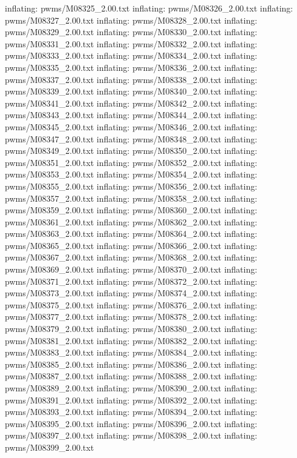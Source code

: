 \documentclass[letterpaper,10pt,english]{sphinxmanual}
\begin{document}
{\begin{sphinxVerbatim}[commandchars=\\\{\}]
  inflating: pwms/M08325\_2.00.txt
  inflating: pwms/M08326\_2.00.txt
  inflating: pwms/M08327\_2.00.txt
  inflating: pwms/M08328\_2.00.txt
  inflating: pwms/M08329\_2.00.txt
  inflating: pwms/M08330\_2.00.txt
  inflating: pwms/M08331\_2.00.txt
  inflating: pwms/M08332\_2.00.txt
  inflating: pwms/M08333\_2.00.txt
  inflating: pwms/M08334\_2.00.txt
  inflating: pwms/M08335\_2.00.txt
  inflating: pwms/M08336\_2.00.txt
  inflating: pwms/M08337\_2.00.txt
  inflating: pwms/M08338\_2.00.txt
  inflating: pwms/M08339\_2.00.txt
  inflating: pwms/M08340\_2.00.txt
  inflating: pwms/M08341\_2.00.txt
  inflating: pwms/M08342\_2.00.txt
  inflating: pwms/M08343\_2.00.txt
  inflating: pwms/M08344\_2.00.txt
  inflating: pwms/M08345\_2.00.txt
  inflating: pwms/M08346\_2.00.txt
  inflating: pwms/M08347\_2.00.txt
  inflating: pwms/M08348\_2.00.txt
  inflating: pwms/M08349\_2.00.txt
  inflating: pwms/M08350\_2.00.txt
  inflating: pwms/M08351\_2.00.txt
  inflating: pwms/M08352\_2.00.txt
  inflating: pwms/M08353\_2.00.txt
  inflating: pwms/M08354\_2.00.txt
  inflating: pwms/M08355\_2.00.txt
  inflating: pwms/M08356\_2.00.txt
  inflating: pwms/M08357\_2.00.txt
  inflating: pwms/M08358\_2.00.txt
  inflating: pwms/M08359\_2.00.txt
  inflating: pwms/M08360\_2.00.txt
  inflating: pwms/M08361\_2.00.txt
  inflating: pwms/M08362\_2.00.txt
  inflating: pwms/M08363\_2.00.txt
  inflating: pwms/M08364\_2.00.txt
  inflating: pwms/M08365\_2.00.txt
  inflating: pwms/M08366\_2.00.txt
  inflating: pwms/M08367\_2.00.txt
  inflating: pwms/M08368\_2.00.txt
  inflating: pwms/M08369\_2.00.txt
  inflating: pwms/M08370\_2.00.txt
  inflating: pwms/M08371\_2.00.txt
  inflating: pwms/M08372\_2.00.txt
  inflating: pwms/M08373\_2.00.txt
  inflating: pwms/M08374\_2.00.txt
  inflating: pwms/M08375\_2.00.txt
  inflating: pwms/M08376\_2.00.txt
  inflating: pwms/M08377\_2.00.txt
  inflating: pwms/M08378\_2.00.txt
  inflating: pwms/M08379\_2.00.txt
  inflating: pwms/M08380\_2.00.txt
  inflating: pwms/M08381\_2.00.txt
  inflating: pwms/M08382\_2.00.txt
  inflating: pwms/M08383\_2.00.txt
  inflating: pwms/M08384\_2.00.txt
  inflating: pwms/M08385\_2.00.txt
  inflating: pwms/M08386\_2.00.txt
  inflating: pwms/M08387\_2.00.txt
  inflating: pwms/M08388\_2.00.txt
  inflating: pwms/M08389\_2.00.txt
  inflating: pwms/M08390\_2.00.txt
  inflating: pwms/M08391\_2.00.txt
  inflating: pwms/M08392\_2.00.txt
  inflating: pwms/M08393\_2.00.txt
  inflating: pwms/M08394\_2.00.txt
  inflating: pwms/M08395\_2.00.txt
  inflating: pwms/M08396\_2.00.txt
  inflating: pwms/M08397\_2.00.txt
  inflating: pwms/M08398\_2.00.txt
  inflating: pwms/M08399\_2.00.txt

\end{sphinxVerbatim}}
\end{document}
